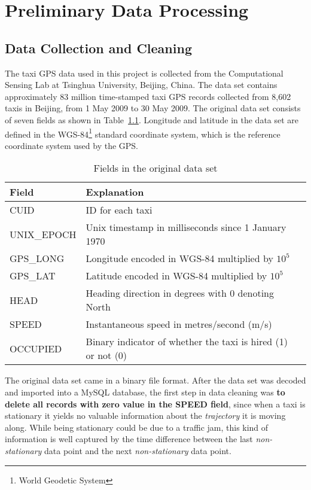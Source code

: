 \chapter{Preliminary Data Processing}
\section{Data Collection and Cleaning}
The taxi GPS data used in this project is collected from the Computational Sensing Lab\cite{BPLL13} at Tsinghua University, Beijing, China. The data set contains approximately 83 million time-stamped taxi GPS records collected from 8,602 taxis in Beijing, from 1 May 2009 to 30 May 2009. The original data set consists of seven fields as shown in Table~\ref{Ta:orig_field}. Longitude and latitude in the data set are defined in the WGS-84\footnote{World Geodetic System} standard coordinate system, which is the reference coordinate system used by the GPS.

\begin{table}
\centering
\begin{tabular}{ | l | l | l | }
\hline
\textbf{Field} & \textbf{Explanation} \\ \hline
CUID & ID for each taxi \\ \hline
UNIX\_EPOCH & Unix timestamp in milliseconds since 1 January 1970\\ \hline
GPS\_LONG & Longitude encoded in WGS-84 multiplied by $10^{5}$\\ \hline
GPS\_LAT & Latitude encoded in WGS-84 multiplied by $10^{5}$ \\ \hline
HEAD & Heading direction in degrees with 0 denoting North\\ \hline
SPEED & Instantaneous speed in metres/second (m/s)\\ \hline
OCCUPIED & Binary indicator of whether the taxi is hired (1) or not (0)\\ \hline
\end{tabular}
\caption{Fields in the original data set}\label{Ta:orig_field}
\end{table}

The original data set came in a binary file format. After the data set was decoded and imported into a MySQL database, the first step in data cleaning was \textbf{to delete all records with zero value in the SPEED field}, since when a taxi is stationary it yields no valuable information about the \emph{trajectory} it is moving along. While being stationary could be due to a traffic jam, this kind of information is well captured by the time difference between the last \emph{non-stationary} data point and the next \emph{non-stationary} data point. 

